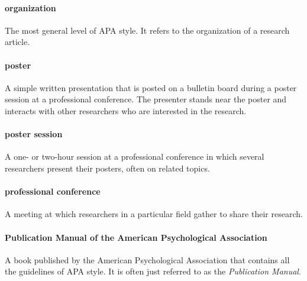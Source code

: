 \documentclass[
]{krantz}
\begin{document}
\hypertarget{organization-1}{%
\paragraph*{organization}\label{organization-1}}

The most general level of APA style. It refers to the organization of a research article.

\hypertarget{poster}{%
\paragraph*{poster}\label{poster}}

A simple written presentation that is posted on a bulletin board during a poster session at a professional conference. The presenter stands near the poster and interacts with other researchers who are interested in the research.

\hypertarget{poster-session}{%
\paragraph*{poster session}\label{poster-session}}

A one- or two-hour session at a professional conference in which several researchers present their posters, often on related topics.

\hypertarget{professional-conference}{%
\paragraph*{professional conference}\label{professional-conference}}

A meeting at which researchers in a particular field gather to share their research.

\hypertarget{publication-manual-of-the-american-psychological-association}{%
\paragraph*{Publication Manual of the American Psychological Association}\label{publication-manual-of-the-american-psychological-association}}

A book published by the American Psychological Association that contains all the guidelines of APA style. It is often just referred to as the \emph{Publication Manual}.
\end{document}
